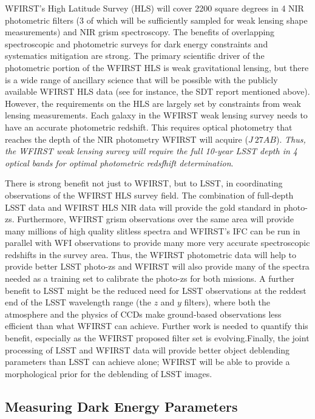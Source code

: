 WFIRST's High Latitude Survey (HLS) will cover
2200 square degrees in 4 NIR photometric filters
(3 of which will be sufficiently sampled for weak lensing shape
measurements) and NIR grism spectroscopy.  The benefits of overlapping
spectroscopic and photometric surveys for dark energy constraints and
systematics mitigation are strong.  The primary scientific driver of the
photometric portion of the WFIRST HLS is weak gravitational lensing,
but there is a wide range of ancillary science that will be possible
with the publicly available WFIRST HLS data (see for instance, the SDT
report mentioned above).  However, the requirements on the HLS are
largely set by constraints from weak lensing measurements.  Each galaxy
in the WFIRST weak lensing survey needs to have an accurate photometric
redshift.  This requires optical photometry that reaches the depth of
the NIR photometry WFIRST will acquire ($J~27AB$).  \emph{Thus, the
WFIRST weak lensing survey will require the full  10-year LSST depth in
4 optical bands for optimal photometric redsfhift determination}.

There is strong benefit not just to WFIRST, but to LSST, in coordinating
observations of the WFIRST HLS survey field. The combination of
full-depth LSST data and WFIRST HLS NIR data will provide the gold
standard in photo-zs.  Furthermore, WFIRST grism observations over the
same area will provide many millions of high quality slitless spectra
and WFIRST's IFC can be run in parallel with WFI observations to provide
many more very accurate spectroscopic redshifts in the survey area.
Thus, the WFIRST photometric data will help to provide better LSST
photo-zs and  WFIRST will also provide many of the spectra needed as a
training set to calibrate the photo-zs for both missions.  A further
benefit to LSST might be the reduced need for LSST observations at the
reddest end of the LSST wavelength range (the $z$ and $y$ filters), where
both the atmosphere and the physics of CCDs make ground-based
observations less efficient than what WFIRST can achieve. Further work is needed to quantify this benefit, especially as the WFIRST proposed filter set is evolving.Finally, the
joint processing of LSST and WFIRST data will provide better object
deblending parameters than LSST can achieve alone; WFIRST will be able
to provide a morphological prior for the deblending of LSST images.


\subsection{Measuring Dark Energy Parameters}
\label{sec:\secname:targets}

